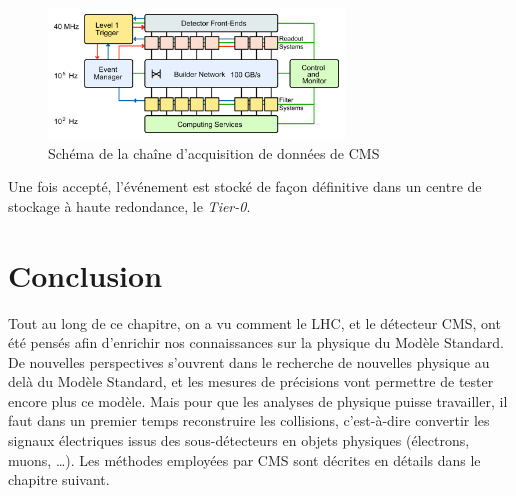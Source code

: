 \begin{figure}[tb] \centering
  \includegraphics[width=0.7\textwidth]{chapitre2/figs/DAQ.pdf}
  \caption{Schéma de la chaîne d'acquisition de données de CMS}
  \label{fig:daq}
\end{figure}

Une fois accepté, l'événement est stocké de façon définitive dans un centre de stockage à haute redondance, le \emph{Tier-0}.

\section{Conclusion}

Tout au long de ce chapitre, on a vu comment le LHC, et le détecteur CMS, ont été pensés afin d'enrichir nos connaissances sur la physique du Modèle Standard. De nouvelles perspectives s'ouvrent dans le recherche de nouvelles physique au delà du Modèle Standard, et les mesures de précisions vont permettre de tester encore plus ce modèle. Mais pour que les analyses de physique puisse travailler, il faut dans un premier temps reconstruire les collisions, c'est-à-dire convertir les signaux électriques issus des sous-détecteurs en objets physiques (électrons, muons, \dots). Les méthodes employées par CMS sont décrites en détails dans le chapitre suivant.